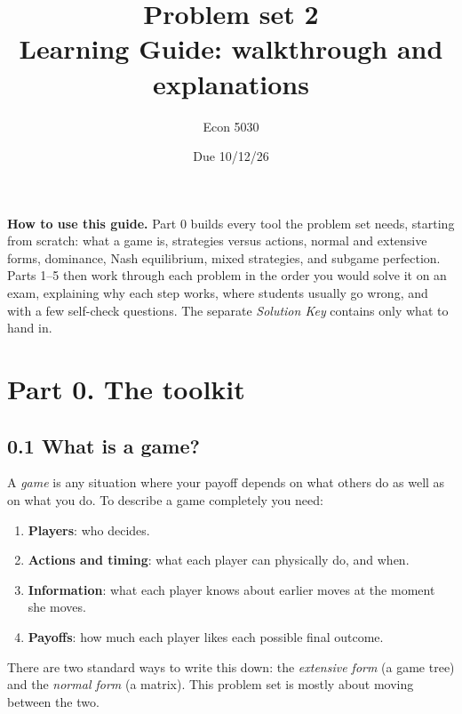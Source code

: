 \documentclass[11pt]{article}
\title{Problem set 2 \\ \large Learning Guide: walkthrough and explanations}
\author{Econ 5030}
\date{Due 10/12/26}
\begin{document}
\maketitle

\begin{center}
\begin{minipage}{0.88\textwidth}
\small
\textbf{How to use this guide.} Part 0 builds every tool the problem set needs, starting from scratch: what a game is, strategies versus actions, normal and extensive forms, dominance, Nash equilibrium, mixed strategies, and subgame perfection. Parts 1--5 then work through each problem in the order you would solve it on an exam, explaining why each step works, where students usually go wrong, and with a few self-check questions. The separate \emph{Solution Key} contains only what to hand in.
\end{minipage}
\end{center}

\tableofcontents
\newpage

\section*{Part 0. The toolkit}

\subsection*{0.1 What is a game?}
A \emph{game} is any situation where your payoff depends on what others do as well as on what you do. To describe a game completely you need:
\begin{enumerate}
\item \textbf{Players}: who decides.
\item \textbf{Actions and timing}: what each player can physically do, and when.
\item \textbf{Information}: what each player knows about earlier moves at the moment she moves.
\item \textbf{Payoffs}: how much each player likes each possible final outcome.
\end{enumerate}
There are two standard ways to write this down: the \emph{extensive form} (a game tree) and the \emph{normal form} (a matrix). This problem set is mostly about moving between the two.
\end{document}
